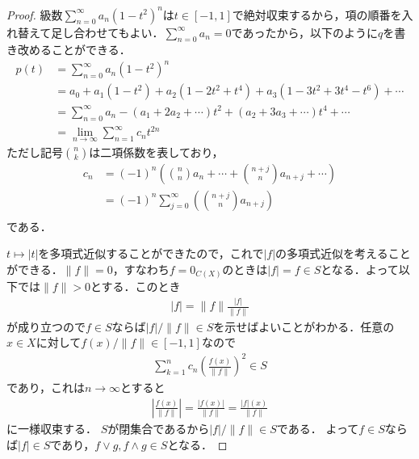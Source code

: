\documentclass[../main.tex]{subfiles}
\begin{document}
\begin{proof}
級数\(\sum_{n = 0}^\infty a_n(1 - t^2)^n\)は\(t \in [-1, 1]\)で絶対収束するから，項の順番を入れ替えて足し合わせてもよい．\(\sum_{n = 0}^\infty a_n = 0\)であったから，以下のように\(q\)を書き改めることができる．
\begin{align*}
  p(t)
  &= \sum_{n = 0}^\infty a_n (1 - t^2)^n \\
  &= a_0 + a_1 (1 - t^2) + a_2(1- 2 t^2 + t^4) + a_3 (1 - 3t^2 + 3t^4 - t^6) + \cdots \\
  &= \sum_{n = 0}^\infty a_n - (a_1 + 2 a_2 + \cdots )t^2 + (a_2 + 3 a_3 + \cdots)t^4 + \cdots \\
  & = \lim_{n \to \infty} \sum_{n = 1}^\infty c_n t^{2n}
\end{align*}
ただし記号\(\displaystyle \binom{n}{k}\)は二項係数を表しており，
\begin{align*}
  c_n & = (-1)^n \left(\binom{n}{n} a_n + \cdots + \binom{n + j}{n} a_{n + j} + \cdots \right) \\
      & = (-1)^n \sum_{j = 0}^\infty \left(\binom{n + j}{n} a_{n + j} \right) \\
\end{align*}
である．

\(t \mapsto \lvert t \rvert\)を多項式近似することができたので，これで\(\lvert f \rvert\)の多項式近似を考えることができる．\(\lVert f\rVert = 0\)，すなわち\(f = 0_{C(X)}\)のときは\(|f| = f\in S\)となる．よって以下では\(\lVert f \rVert > 0\)とする．このとき
\begin{align*}
  \lvert f \rvert = \|f\| \frac{|f|}{\|f\|}
\end{align*}
が成り立つので\(f \in S\)ならば\(|f|/\|f\| \in S\)を示せばよいことがわかる．任意の\(x \in X\)に対して\(f(x)/\|f\| \in [-1, 1]\)なので
\begin{align*}
  \sum_{k = 1}^n c_n \left( \frac{f(x)}{\|f\|} \right)^2 \in S
\end{align*}
であり，これは\(n \to \infty\)とすると
\begin{align*}
  \left|\frac{f(x)}{\|f\|}\right|
  = \frac{|f(x)|}{\|f\|}
  = \frac{|f|(x)}{\|f\|}
\end{align*}
に一様収束する．
\(S\)が閉集合であるから\(|f|/\|f\| \in S\)である．
よって\(f \in S\)ならば\(|f| \in S\)であり，\(f \lor g, f \land g \in S\)となる．
\end{proof}
\end{document}
